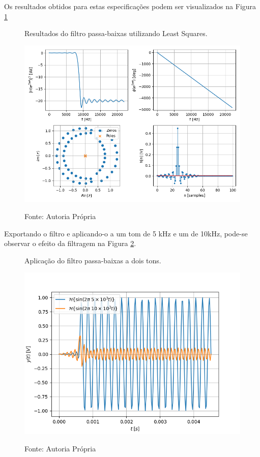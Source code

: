 \documentclass[12pt,a4paper]{report}
\begin{document}
  Os resultados obtidos para estas especificações podem ser visualizados na Figura
  \ref{fig:least_squares_results}
  \begin{figure}[H]
    \caption{Resultados do filtro passa-baixas utilizando Least Squares.}
    \centering
    \includegraphics[width=\textwidth]{images/least_squares_results}
    \label{fig:least_squares_results}
    \caption*{Fonte: Autoria Própria}
  \end{figure}

  Exportando o filtro e aplicando-o a um tom de 5 kHz e um de 10kHz, pode-se observar o efeito da filtragem na
  Figura \ref{fig:least_squares_tones}.
  \begin{figure}[H]
    \caption{Aplicação do filtro passa-baixas a dois tons.}
    \centering
    \includegraphics[width=\textwidth]{images/least_squares_tones}
    \label{fig:least_squares_tones}
    \caption*{Fonte: Autoria Própria}
  \end{figure}
\end{document}
